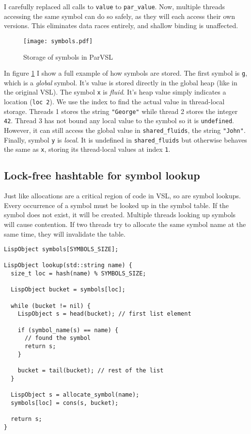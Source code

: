I carefully replaced all calls to \texttt{value} to \texttt{par\_value}. Now, multiple threads accessing the same symbol
can do so safely, as they will each access their own versions. This eliminates data races entirely,
and shallow binding is unaffected.

\begin{figure}[H]
  \centering
  \texttt{[image: symbols.pdf]}
  \label{fig:symbols}
  \caption{Storage of symbols in ParVSL}
\end{figure}

In figure \ref{fig:symbols} I show a full example of how symbols are stored. The first symbol is \texttt{g}, which
is a \emph{global} symbol. It's value is stored directly in the global heap (like in the original VSL). The symbol \texttt{x}
is \emph{fluid}. It's heap value simply indicates a location (\texttt{loc 2}). We use the index to find the actual value
in thread-local storage. Threads 1 stores the string \texttt{"George"} while thread 2 stores the integer \texttt{42}.
Thread 3 has not bound any local value to the symbol so it is \texttt{undefined}. However, it can still access the
global value in \verb|shared_fluids|, the string \verb|"John"|. Finally, symbol \verb|y| is \emph{local}. It is
undefined in \verb|shared_fluids| but otherwise behaves the same as \verb|x|, storing its thread-local values at
index \verb|1|.

\subsection{Lock-free hashtable for symbol lookup}
\label{sec:hashtable}
Just like allocations are a critical region of code in VSL, so are symbol lookups.
Every occurrence of a symbol must be looked up in the symbol table. If the symbol does
not exist, it will be created. Multiple threads looking up symbols will cause contention.
If two threads try to allocate the same symbol name at the same time, they will invalidate
the table.

\begin{verbatim}
LispObject symbols[SYMBOLS_SIZE];

LispObject lookup(std::string name) {
  size_t loc = hash(name) % SYMBOLS_SIZE;

  LispObject bucket = symbols[loc];

  while (bucket != nil) {
    LispObject s = head(bucket); // first list element

    if (symbol_name(s) == name) {
      // found the symbol
      return s;
    }

    bucket = tail(bucket); // rest of the list
  }

  LispObject s = allocate_symbol(name);
  symbols[loc] = cons(s, bucket);

  return s;
}
\end{verbatim}

